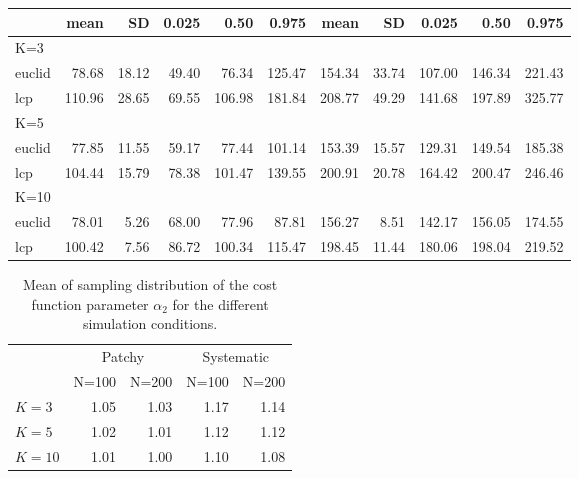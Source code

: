 \begin{table}[htp]
{\begin{tabular}{l|rrrrrrrrrr}
         &   mean &  SD  & 0.025 & 0.50  & 0.975  & mean  & SD   & 0.025 & 0.50  & 0.975 \\ \hline
K=3      &        &      &       &       &        &       &      &       &       &       \\
euclid   &  78.68 & 18.12& 49.40 & 76.34 & 125.47 & 154.34& 33.74& 107.00& 146.34& 221.43\\
lcp      & 110.96 & 28.65& 69.55 &106.98 & 181.84 & 208.77& 49.29& 141.68& 197.89& 325.77\\
K=5      &        &      &       &       &        &       &      &       &       &        \\
euclid   &  77.85 & 11.55& 59.17 & 77.44 & 101.14 & 153.39& 15.57& 129.31& 149.54& 185.38\\
lcp      & 104.44 & 15.79& 78.38 &101.47 & 139.55 & 200.91& 20.78& 164.42& 200.47& 246.46\\
K=10     &        &      &       &       &        &       &      &       &       &       \\
euclid   &  78.01 & 5.26 & 68.00 & 77.96 & 87.81  & 156.27&  8.51& 142.17& 156.05& 174.55\\
lcp      & 100.42 & 7.56 & 86.72 &100.34 & 115.47 & 198.45& 11.44& 180.06& 198.04& 219.52\\ \hline
\end{tabular}
}
\end{table}





\begin{table}[htp]
\centering
\caption{
Mean of sampling distribution of the cost function parameter
$\alpha_{2}$ for the different simulation
conditions.
}
\begin{tabular}{l|rrrr}
 & \multicolumn{2}{c}{Patchy} & \multicolumn{2}{c}{Systematic} \\
    & N=100 &  N=200  &   N=100 &  N=200  \\ \hline
$K=3$  &   1.05&    1.03 &     1.17 & 1.14 \\
$K=5$  &   1.02&    1.01 &     1.12 &1.12 \\
$K=10$ &   1.01&    1.00 &     1.10 &1.08 \\
\end{tabular}
\label{tab.results2}
\end{table}




